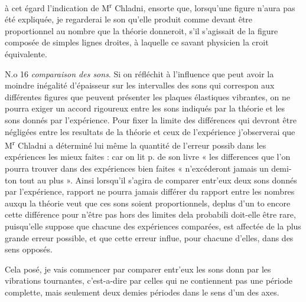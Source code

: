 \documentclass[11pt,a4paper]{article}
\begin{document}
à cet égard l'indication de M\textsuperscript{r} Chladni, ensorte que, lorsqu'une figure
n'aura pas été expliquée, je regarderai le son qu'elle produit comme devant
être proportionnel au nombre que la théorie donneroit, s'il s'agissait de
la figure composée de simples lignes droites, à laquelle ce savant
physicien la croit équivalente.

N.o 16 \emph{comparaison des sons}. Si on réfléchit à l'influence que peut avoir
la moindre inégalité d'épaisseur sur les intervalles des sons qui correspon
aux différentes figures que peuvent présenter les plaques élastiques
vibrantes, on ne pourra exiger un accord rigoureux entre les sons
indiqués par la théorie et les sons donnés par l'expérience. Pour
fixer la limite des différences qui devront être négligées entre les
resultats de la théorie et ceux de l'expérience j'observerai que
M\textsuperscript{r} Chladni a déterminé lui même la quantité de l'erreur possib
dans les expériences les mieux faites : car on lit p.  de son livre
« les differences que l'on pourra trouver dans des expériences bien faites
« n'excéderont jamais un demi-ton tout au plus ». Ainsi lorsqu'il
s'agira de comparer entr'eux deux sons donnés par l'expérience, 
rapport ne pourra jamais différer du rapport entre les nombres auxqu
la théorie veut que ces sons soient proportionnels, deplus d'un to
encore cette différence pour n'être pas hors des limites dela probabili
doit-elle être rare, puisqu'elle suppose que chacune des expériences
comparées, est affectée de la plus grande erreur possible, et que
cette erreur influe, pour chacune d'elles, dans des sens opposés.

Cela posé, je vais commencer par comparer entr'eux les sons donn
par les vibrations tournantes, c'est-a-dire par celles qui ne
contiennent pas une période complette, mais seulement deux demies
périodes dans le sens d'un des axes.

\end{document}
